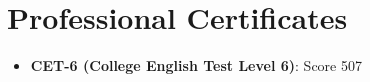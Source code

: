 \section{Professional Certificates}
\begin{itemize}
  \item \textbf{CET-6 (College English Test Level 6)}: Score 507
\end{itemize}

